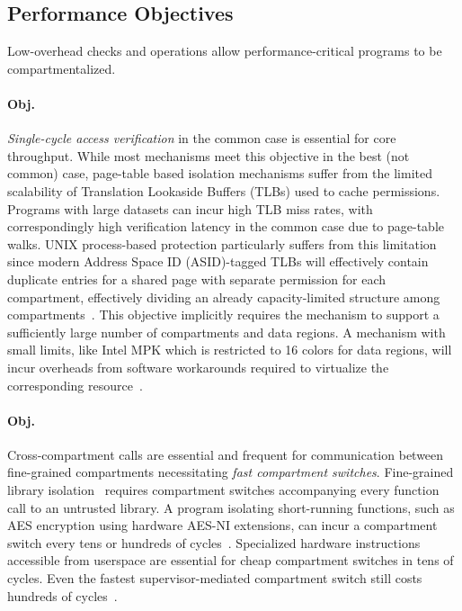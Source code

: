 \subsection{Performance Objectives}
\label{sec:seccells:reqs:performance}
Low-overhead checks and operations allow performance-critical
programs to be compartmentalized.

\paragraph{Obj. } 
\emph{Single-cycle access verification} in the common case
is essential for core throughput.
While most mechanisms meet this objective in the best (not common) case, 
page-table based isolation mechanisms suffer from the limited scalability
of Translation Lookaside Buffers (TLBs) used to cache permissions.
Programs with large datasets can incur high TLB miss rates, with 
correspondingly high verification latency in the common case due to 
page-table walks.
UNIX process-based protection particularly suffers from this limitation since
modern Address Space ID (ASID)-tagged TLBs will effectively contain duplicate
entries for a shared page with separate permission for each compartment,
effectively dividing an already capacity-limited structure among 
compartments~\cite{HsuHEP16}.
This objective implicitly requires the mechanism to support
a sufficiently large number of compartments and data regions.
A mechanism with small limits, like Intel MPK which is restricted to
16 colors for data regions, will incur overheads from software workarounds
required to virtualize the corresponding resource~\cite{ParkLXMK19}.

\paragraph{Obj. } 
Cross-compartment calls are essential and
frequent for communication between fine-grained compartments
necessitating \emph{fast compartment switches}.
Fine-grained library isolation~\cite{GhosnKPLB21} requires compartment 
switches accompanying every function call to an untrusted library.
A program isolating short-running functions, 
such as AES encryption using hardware AES-NI extensions, 
can incur a compartment switch every tens or hundreds of 
cycles~\cite{AbdAllahAES}.
Specialized hardware instructions accessible from userspace are
essential for cheap compartment switches in tens of cycles.
Even the fastest supervisor-mediated compartment switch still costs
hundreds of cycles~\cite{WatsonWNMACDDGL15}.

